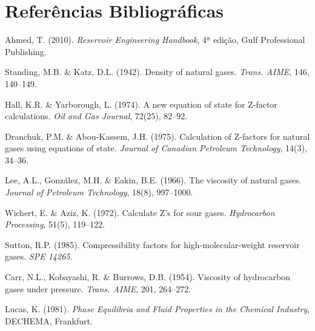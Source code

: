 \documentclass[12pt, a4paper]{article}
\begin{document}
\section{Referências Bibliográficas}

\begin{enumerate}[label={[\arabic*]}, leftmargin=2cm]
  \item Ahmed, T. (2010). \textit{Reservoir Engineering Handbook},
        4ª edição, Gulf Professional Publishing.

  \item Standing, M.B. \& Katz, D.L. (1942). Density of natural gases.
        \textit{Trans. AIME}, 146, 140--149.

  \item Hall, K.R. \& Yarborough, L. (1974). A new equation of state
        for Z-factor calculations. \textit{Oil and Gas Journal}, 72(25), 82--92.

  \item Dranchuk, P.M. \& Abou-Kassem, J.H. (1975). Calculation of Z-factors
        for natural gases using equations of state.
        \textit{Journal of Canadian Petroleum Technology}, 14(3), 34--36.

  \item Lee, A.L., González, M.H. \& Eakin, B.E. (1966). The viscosity of
        natural gases. \textit{Journal of Petroleum Technology}, 18(8), 997--1000.

  \item Wichert, E. \& Aziz, K. (1972). Calculate Z's for sour gases.
        \textit{Hydrocarbon Processing}, 51(5), 119--122.

  \item Sutton, R.P. (1985). Compressibility factors for high-molecular-weight
        reservoir gases. \textit{SPE 14265}.

  \item Carr, N.L., Kobayashi, R. \& Burrows, D.B. (1954). Viscosity of hydrocarbon
        gases under pressure. \textit{Trans. AIME}, 201, 264--272.

  \item Lucas, K. (1981). \textit{Phase Equilibria and Fluid Properties in the
        Chemical Industry}, DECHEMA, Frankfurt.
\end{enumerate}
\end{document}
